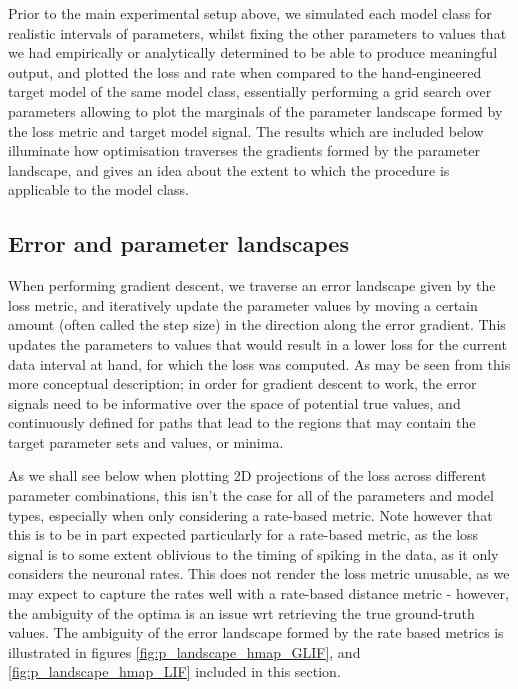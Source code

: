 \documentclass[mphil,deptreport,ianc]{infthesis} %
\begin{document}
Prior to the main experimental setup above, we simulated each model class for realistic intervals of parameters, whilst fixing the other parameters to values that we had empirically or analytically determined to be able to produce meaningful output, and plotted the loss and rate when compared to the hand-engineered target model of the same model class, essentially performing a grid search over parameters allowing to plot the marginals of the parameter landscape formed by the loss metric and target model signal.
The results which are included below illuminate how optimisation traverses the gradients formed by the parameter landscape, and gives an idea about the extent to which the procedure is applicable to the model class.


\subsection{Error and parameter landscapes}\label{sect:e_landscapes}

When performing gradient descent, we traverse an error landscape given by the loss metric, and iteratively update the parameter values by moving a certain amount (often called the step size) in the direction along the error gradient. 
This updates the parameters to values that would result in a lower loss for the current data interval at hand, for which the loss was computed.
As may be seen from this more conceptual description; in order for gradient descent to work, the error signals need to be informative over the space of potential true values, and continuously defined for paths that lead to the regions that may contain the target parameter sets and values, or minima.

As we shall see below when plotting 2D projections of the loss across different parameter combinations, this isn't the case for all of the parameters and model types, especially when only considering a rate-based metric.
Note however that this is to be in part expected particularly for a rate-based metric, as the loss signal is to some extent oblivious to the timing of spiking in the data, as it only considers the neuronal rates.
This does not render the loss metric unusable, as we may expect to capture the rates well with a rate-based distance metric - however, the ambiguity of the optima is an issue wrt retrieving the true ground-truth values.
The ambiguity of the error landscape formed by the rate based metrics is illustrated in figures \ref{fig:p_landscape_hmap_GLIF}, and \ref{fig:p_landscape_hmap_LIF} included in this section.
\end{document}
